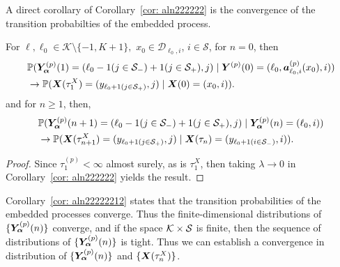 A direct corollary of Corollary~\ref{cor: aln222222} is the convergence of the transition probabilties of the embedded process. 
\begin{cor}\label{cor: aln22222212} For \(\ell,\ell_0\in \mathcal K \setminus \{-1,K+1\},\) \(x_0\in\mathcal D_{\ell_0,i}\), \(i\in\mathcal S\), 
		for \(n=0\), then
		\begin{align}
			&\mathbb P(\bm{Y}_{\bm{\alpha}}^{(p)}(1) = (\ell_0-1(j\in\mathcal{S}_-)+1(j\in\mathcal{S}_+),j) 
					 \mid \boldsymbol Y^{(p)}(0) = (\ell_0,\boldsymbol a_{\ell_0,i}^{(p)}(x_0),i)) \nonumber
			\\&\to  
				\mathbb P(\boldsymbol X(\tau_1^X) = (y_{\ell_0+1(j\in\mathcal{S}_+)}, j)  \mid \boldsymbol X(0) = (x_0,i)).\label{eqn: lim 2}
		\end{align}
		and for \(n\geq 1\), then, 
		\begin{align}
			&\mathbb P(\bm{Y}_{\bm{\alpha}}^{(p)}(n+1) = (\ell_0-1(j\in\mathcal{S}_-)+1(j\in\mathcal{S}_+),j) 
					 \mid \bm{Y}_{\bm{\alpha}}^{(p)}(n) = (\ell_0,i) ) \nonumber
			\\&\to  
				\mathbb P(\boldsymbol X(\tau_{n+1}^X) = (y_{\ell_0+1(j\in\mathcal{S}_+)}, j) \mid \boldsymbol X(\tau_{n}) = (y_{\ell_0+1(i\in\mathcal{S}_-)},i) ).\label{eqn: ddddddd2}
		\end{align}
\end{cor}
\begin{proof}
	Since \(\tau_1^{(p)}<\infty\) almost surely, as is \(\tau_1^X\), then taking \(\lambda \to 0\) in Corollary~\ref{cor: aln222222} yields the result. 
\end{proof}
Corollary~\ref{cor: aln22222212} states that the transition probabilities of the embedded processes converge. Thus the finite-dimensional distributions of \(\{\bm{Y}_{\bm{\alpha}}^{(p)}(n)\}\) converge, and if the space \(\mathcal K\times \mathcal{S}\) is finite, then the sequence of distributions of \(\{\bm{Y}_{\bm{\alpha}}^{(p)}(n)\}\) is tight. Thus we can establish a convergence in distribution of \(\{\bm{Y}_{\bm{\alpha}}^{(p)}(n)\}\) and \(\{\boldsymbol X(\tau_n^X)\}\). 

